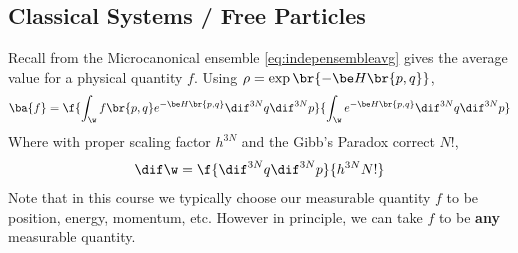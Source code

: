 \documentclass{article}
\begin{document}
\subsection{Classical Systems / Free Particles}
Recall from the Microcanonical ensemble \eqref{eq:indepensembleavg} gives the average value for a physical quantity $f$. Using $\rho = \exp\br{-\be H\br{p,q}}$,
\[ \ba{f} = \f{\int_{\w} f\br{p,q}e^{-\be H\br{p,q}} \dif^{3N} q \dif^{3N} p}{\int_{\w} e^{-\be H\br{p,q}} \dif^{3N} q \dif^{3N} p}
 \]
Where with proper scaling factor $h^{3N}$ and the Gibb's Paradox correct $N!$,
\[ \dif \w =  \f{\dif^{3N} q \dif^{3N} p}{h^{3N} N!} \]
Note that in this course we typically choose our measurable quantity $f$ to be position, energy, momentum, etc. However in principle, we can take $f$ to be \textbf{any} measurable quantity.\\
\end{document}
